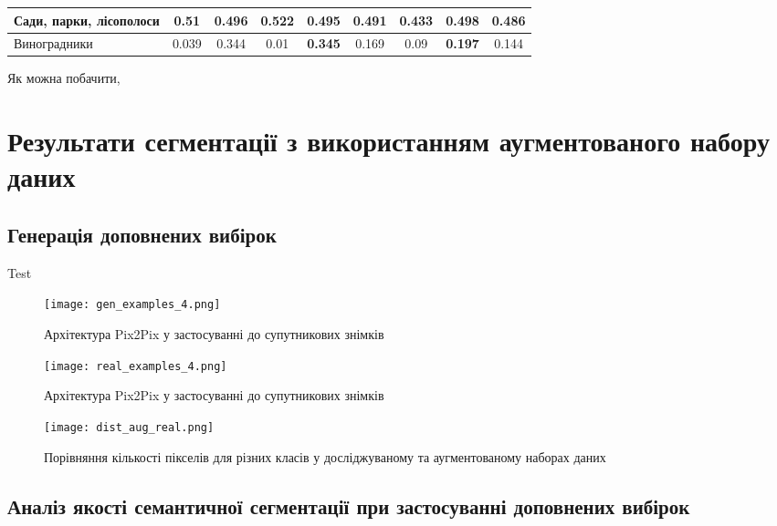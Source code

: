 \begin{table}[!ht]
\begin{tabular}{|K|C|C|C|C|C|C|C|C|}
        \hline Сади, парки, лісополоси & 0.51                            & 0.496                           & \textbf{0.522} & 0.495          & 0.491          & 0.433          & \textbf{0.498} & 0.486          \\
        \hline Виноградники            & 0.039                           & 0.344                           & 0.01           & \textbf{0.345} & 0.169          & 0.09           & \textbf{0.197} & 0.144          \\
        \hline
    \end{tabular}
    \label{tab:segm_result_real_per_classes}
\end{table}

Як можна побачити,

\section{Результати сегментації з використанням аугментованого набору даних}

\subsection{Генерація доповнених вибірок}

Test

\begin{figure}[ht]
    \centering
    \texttt{[image: gen\_examples\_4.png]}
    \caption{Архітектура Pix2Pix у застосуванні до супутникових знімків}
    \label{fig:gen_examples}
\end{figure}

\begin{figure}[ht]
    \centering
    \texttt{[image: real\_examples\_4.png]}
    \caption{Архітектура Pix2Pix у застосуванні до супутникових знімків}
    \label{fig:real_examples}
\end{figure}

\begin{figure}[ht!]
    \centering
    \texttt{[image: dist\_aug\_real.png]}
    \caption{Порівняння кількості пікселів для різних класів
        у досліджуваному та аугментованому наборах даних}
    \label{fig:pixels_per_class_aug}
\end{figure}

\subsection{Аналіз якості семантичної сегментації при застосуванні
    доповнених вибірок}

